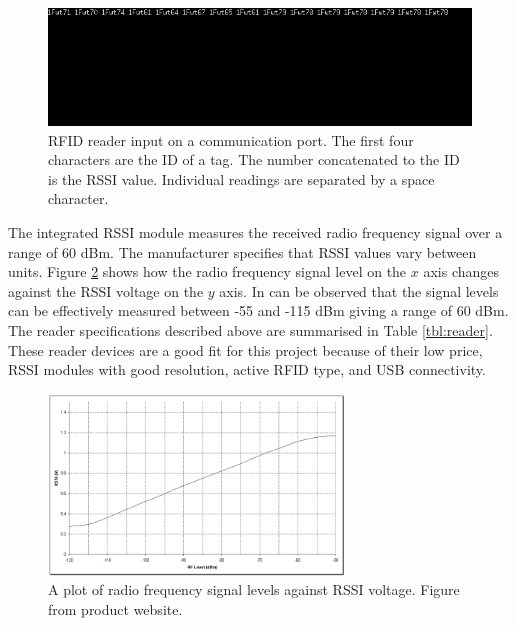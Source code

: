 \begin{figure}[h]
	\begin{center}
		\includegraphics[width=1\textwidth]{figures/com}
		\caption{RFID reader input on a communication port. The first four characters are the ID of a tag. The number concatenated to the ID is the RSSI value. Individual readings are separated by a space character.}
		\label{fig:comm}
	\end{center}
\end{figure}

The integrated RSSI module measures the received radio frequency signal over a range of 60 dBm. The manufacturer specifies that RSSI values vary between units\footnotemark[2].  Figure \ref{fig:rssi} shows how the radio frequency signal level on the $x$ axis changes against the RSSI voltage on the $y$ axis. In can be observed that the signal levels can be effectively measured between -55 and -115 dBm giving a range of 60 dBm. The reader specifications described above are summarised in Table \ref{tbl:reader}. These reader devices are a good fit for this project because of their low price, RSSI modules with good resolution, active RFID type, and USB connectivity.

\begin{figure}[h]
	\begin{center}
		\includegraphics[width=0.7\textwidth]{figures/rssi}
		\caption{A plot of radio frequency signal levels against RSSI voltage. Figure from product website\protect\footnotemark[2].}
		\label{fig:rssi}
	\end{center}
\end{figure}

